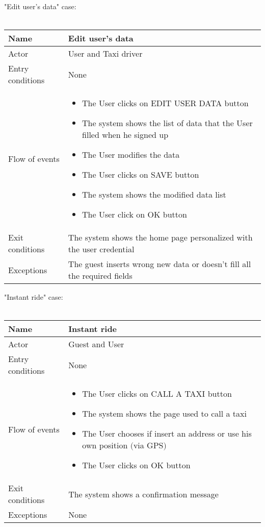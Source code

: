 \newpage
"Edit user's data" case:
\\
\\
\begin{tabular}{|p{3cm}|p{10cm}|} 
\hline
Name & Edit user's data\\
\hline
Actor & User and Taxi driver\\
\hline
Entry conditions & None\\
\hline
Flow of events & 
	\begin{itemize}
		\item The User clicks on EDIT USER DATA button
		\item The system shows the list of data that the User filled when he signed up
		\item The User modifies the data
		\item The User clicks on SAVE button
		\item The system shows the modified data list
		\item The User click on OK button
	\end{itemize}	\\
\hline
Exit conditions & The system shows the home page personalized with the user credential\\
\hline
Exceptions & The guest inserts wrong new data or doesn't fill all the required fields\\
\hline
\end {tabular}


\newpage
"Instant ride" case:
\\
\\
\begin{tabular}{|l|p{10cm}|} 
\hline
Name & Instant ride\\
\hline
Actor & Guest and User\\
\hline
Entry conditions & None\\
\hline
Flow of events &
	\begin{itemize}
		\item The User clicks on CALL A TAXI button
		\item The system shows the page used to call a taxi
		\item The User chooses if insert an address or use his own position $($via GPS$)$
		\item The User clicks on OK button
	\end{itemize}\\
\hline
Exit conditions & The system shows a confirmation message\\
\hline
Exceptions & None\\
\hline
\end {tabular}


